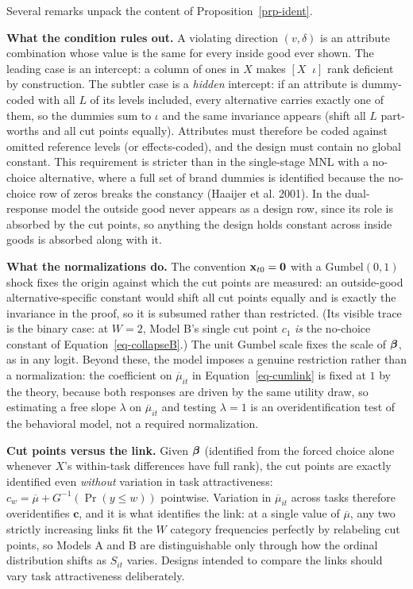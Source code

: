 \documentclass[
  letterpaper,
  DIV=11,
  numbers=noendperiod]{scrartcl}
\theoremstyle{plain}
\theoremstyle{plain}
\theoremstyle{remark}
\begin{document}
Several remarks unpack the content of Proposition~\ref{prp-ident}.

\textbf{What the condition rules out.} A violating direction
\(\left( v, \delta \right)\) is an attribute combination whose value is
the same for every inside good ever shown. The leading case is an
intercept: a column of ones in \(X\) makes
\(\left[ X \;\; \iota \right]\) rank deficient by construction. The
subtler case is a \emph{hidden} intercept: if an attribute is
dummy-coded with all \(L\) of its levels included, every alternative
carries exactly one of them, so the dummies sum to \(\iota\) and the
same invariance appears (shift all \(L\) part-worths and all cut points
equally). Attributes must therefore be coded against omitted reference
levels (or effects-coded), and the design must contain no global
constant. This requirement is stricter than in the single-stage MNL with
a no-choice alternative, where a full set of brand dummies is identified
because the no-choice row of zeros breaks the constancy (Haaijer et al.
2001). In the dual-response model the outside good never appears as a
design row, since its role is absorbed by the cut points, so anything
the design holds constant across inside goods is absorbed along with it.

\textbf{What the normalizations do.} The convention
\(\mathbf{x}_{t0} = \mathbf{0}\) with a \(\text{Gumbel}(0,1)\) shock fixes the
origin against which the cut points are measured: an outside-good
alternative-specific constant would shift all cut points equally and is
exactly the invariance in the proof, so it is subsumed rather than
restricted. (Its visible trace is the binary case: at \(W=2\), Model B's
single cut point \(c_1\) \emph{is} the no-choice constant of
Equation~\ref{eq-collapseB}.) The unit Gumbel scale fixes the scale of
\(\boldsymbol{\beta}\), as in any logit. Beyond these, the model imposes a genuine
restriction rather than a normalization: the coefficient on
\(\overline{\mu}_{it}\) in Equation~\ref{eq-cumlink} is fixed at \(1\)
by the theory, because both responses are driven by the same utility
draw, so estimating a free slope \(\lambda\) on \(\overline{\mu}_{it}\)
and testing \(\lambda = 1\) is an overidentification test of the
behavioral model, not a required normalization.

\textbf{Cut points versus the link.} Given \(\boldsymbol{\beta}\) (identified from
the forced choice alone whenever \(X\)'s within-task differences have
full rank), the cut points are exactly identified even \emph{without}
variation in task attractiveness:
\(c_w = \overline{\mu} + G^{-1} \left( \Pr(y \le w) \right)\) pointwise.
Variation in \(\overline{\mu}_{it}\) across tasks therefore
overidentifies \(\mathbf{c}\), and it is what identifies the link: at a
single value of \(\overline{\mu}\), any two strictly increasing links
fit the \(W\) category frequencies perfectly by relabeling cut points,
so Models A and B are distinguishable only through how the ordinal
distribution shifts as \(S_{it}\) varies. Designs intended to compare
the links should vary task attractiveness deliberately.
\end{document}
